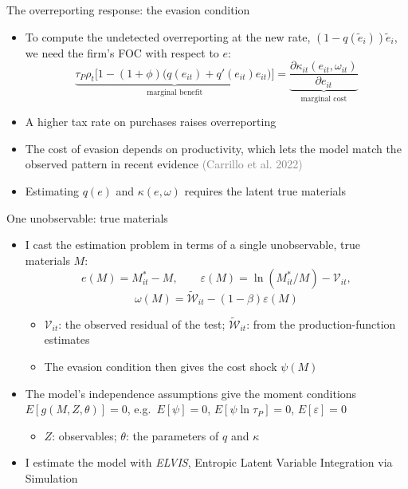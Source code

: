\documentclass[
  ignorenonframetext,
  aspectratio=169,
]{beamer}
\providecommand{\tightlist}{%
  \setlength{\itemsep}{0pt}\setlength{\parskip}{0pt}}
\newcommand{\sm}[1]{\textcolor{gray}{\footnotesize #1}} %
\begin{document}
\begin{frame}{The overreporting response: the evasion condition}
\protect{}\label{the-overreporting-response-the-evasion-condition}
\begin{itemize}
\tightlist
\item
  To compute the undetected overreporting at the new rate,
  \((1-q(\tilde e_i))\tilde e_i\), we need the firm's FOC with respect
  to \(e\): \[
  \underbrace{\tau_P\rho_t\big[1-(1+\phi)\big(q(e_{it})+q'(e_{it})e_{it}\big)\big]}_{\text{marginal benefit}}=\underbrace{\frac{\partial\kappa_{it}(e_{it},\omega_{it})}{\partial e_{it}}}_{\text{marginal cost}}
  \]
\item
  A higher tax rate on purchases raises overreporting
\item
  The cost of evasion depends on productivity, which lets the model
  match the observed pattern in recent evidence \sm{(Carrillo et al.
  2022)}
\item
  Estimating \(q(e)\) and \(\kappa(e,\omega)\) requires the latent true
  materials
\end{itemize}
\end{frame}

\begin{frame}{One unobservable: true materials}
\protect{}\label{one-unobservable-true-materials}
\begin{itemize}
\tightlist
\item
  I cast the estimation problem in terms of a single unobservable, true
  materials \(M\): \[
  e(M)=M^*_{it}-M,\qquad\varepsilon(M)=\ln(M^*_{it}/M)-\mathcal V_{it},
  \] \[
  \omega(M)=\tilde{\mathcal W}_{it}-(1-\beta)\varepsilon(M)
  \]

  \begin{itemize}
  \tightlist
  \item
    \(\mathcal V_{it}\): the observed residual of the test;
    \(\tilde{\mathcal W}_{it}\): from the production-function estimates
  \item
    The evasion condition then gives the cost shock \(\psi(M)\)
  \end{itemize}
\item
  The model's independence assumptions give the moment conditions
  \(E[g(M,Z,\theta)]=0\), e.g.~\(E[\psi]=0\), \(E[\psi\ln\tau_P]=0\),
  \(E[\varepsilon]=0\)

  \begin{itemize}
  \tightlist
  \item
    \(Z\): observables; \(\theta\): the parameters of \(q\) and
    \(\kappa\)
  \end{itemize}
\item
  I estimate the model with \emph{ELVIS}, Entropic Latent Variable
  Integration via Simulation
\end{itemize}
\end{frame}
\end{document}
